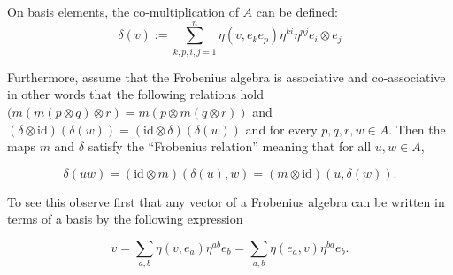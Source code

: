 \documentclass{amsart}
\newcommand{\be}{\begin{equation}}
\newcommand{\ee}{\end{equation}}
\newcommand{\tensor}{\otimes}
\newcommand{\id}{\mathrm{id}}
\theoremstyle{definition}
\begin{document}
    


On basis elements, the co-multiplication of $A$ can be defined: \be\label{eqn:deltabasis}
\delta(v):=\sum_{k,p,i,j=1}^{n}\eta(v,e_k e_p)\eta^{ki}\eta^{pj}e_i\otimes e_j\ee





\noindent Furthermore, assume that the Frobenius algebra is associative and co-associative in other words that the following relations hold $(m(m(p\otimes q)\otimes r)=m(p\otimes m(q\otimes r))$ and $(\delta\otimes \id)(\delta(w))=(\id\otimes\delta)(\delta(w))$ and for every $p,q,r,w \in A$. Then the maps $m$ and $\delta$ satisfy the ``Frobenius relation'' meaning that for all $u,w \in A$, 

\be\label{eqn:frobrel}\delta(uw)=(\id\tensor m)(\delta(u),w)=(m\tensor\id)(u,\delta(w)).\ee 

To see this observe first that any vector of a Frobenius algebra can be written in terms of a basis by the following expression

\be\label{eqn:canonbasis}
v=\sum_{a,b}\eta(v,e_a)\eta^{ab}e_b=\sum_{a,b}\eta(e_a,v)\eta^{ba}e_b.
\ee
\end{document}
